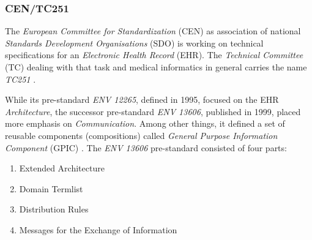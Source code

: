 %
%
%
%
%
%
%

\subsubsection{CEN/TC251}
\label{cen_tc251_heading}

The \emph{European Committee for Standardization} (CEN) as association of
national \emph{Standards Development Organisations} (SDO) is working on
technical specifications for an \emph{Electronic Health Record} (EHR). The
\emph{Technical Committee} (TC) dealing with that task and medical informatics
in general carries the name \emph{TC251} \cite{centc251}.

While its pre-standard \emph{ENV 12265}, defined in 1995, focused on the EHR
\emph{Architecture}, the successor pre-standard \emph{ENV 13606}, published in
1999, placed more emphasis on \emph{Communication}. Among other things, it
defined a set of reusable components (compositions) called
\emph{General Purpose Information Component} (GPIC) \cite{marley}.
The \emph{ENV 13606} pre-standard consisted of four parts:

\begin{enumerate}
    \item Extended Architecture
    \item Domain Termlist
    \item Distribution Rules
    \item Messages for the Exchange of Information
\end{enumerate}

